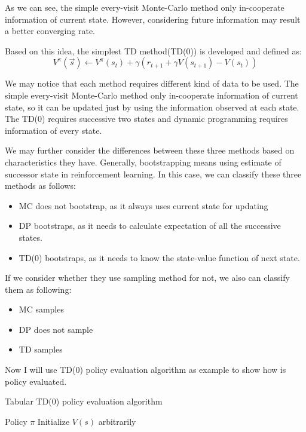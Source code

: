 \documentclass[officiallayout]{tktla}
\begin{document}
As we can see, the simple every-visit Monte-Carlo method only in-cooperate information of current state. However, considering future information may result a better converging rate.

Based on this idea, the simplest TD method(TD(0)) is developed and defined as:
\begin{equation}
V^\pi(\vec{s}) \leftarrow V^\pi(s_t) + \gamma (r_{t+1} + \gamma V(s_{t+1})- V(s_t))
\end{equation}

We may notice that each method requires different kind of data to be used. The simple every-visit Monte-Carlo method only in-cooperate information of current state, so it can be updated just by using the information observed at each state. The TD(0) requires successive two states and dynamic programming requires information of every state.

We may further consider the differences between these three methods based on characteristics they have. Generally, bootstrapping means using estimate of successor state in reinforcement learning. In this case, we can classify these three methods as follows:
\begin{itemize}
\item MC does not bootstrap, as it always uses current state for updating
\item DP bootstraps, as it needs to calculate expectation of all the successive states.
\item TD(0) bootstraps, as it needs to know the state-value function of next state.
\end{itemize}
If we consider whether they use sampling method for not, we also can classify them as following:
\begin{itemize}
\item MC samples
\item DP does not sample
\item TD samples
\end{itemize}

Now I will use TD(0) policy evaluation algorithm as example to show how is policy evaluated.
\newline
\newline
\begin{algorithm}[t]
\caption{Tabular TD(0) policy evaluation algorithm}
\label{algo:adam}
\begin{algorithmic}
 \REQUIRE Policy $\pi$
 Initialize $V(s)$ arbitrarily \;
\end{algorithmic}
\vspace{-0.05in}
\end{algorithm}
\end{document}
